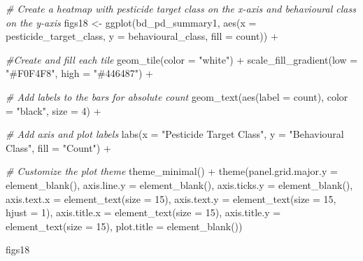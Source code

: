 \documentclass[
]{article}
\newenvironment{Shaded}{\begin{snugshade}}{\end{snugshade}}
\newcommand{\AttributeTok}[1]{\textcolor[rgb]{0.77,0.63,0.00}{#1}}
\newcommand{\CommentTok}[1]{\textcolor[rgb]{0.56,0.35,0.01}{\textit{#1}}}
\newcommand{\DecValTok}[1]{\textcolor[rgb]{0.00,0.00,0.81}{#1}}
\newcommand{\FunctionTok}[1]{\textcolor[rgb]{0.00,0.00,0.00}{#1}}
\newcommand{\NormalTok}[1]{#1}
\newcommand{\OtherTok}[1]{\textcolor[rgb]{0.56,0.35,0.01}{#1}}
\newcommand{\SpecialCharTok}[1]{\textcolor[rgb]{0.00,0.00,0.00}{#1}}
\newcommand{\StringTok}[1]{\textcolor[rgb]{0.31,0.60,0.02}{#1}}
\begin{document}
\begin{Shaded}
\begin{Highlighting}[]
\CommentTok{\# Create a heatmap with pesticide target class on the x{-}axis and behavioural class on the y{-}axis}
\NormalTok{figs18 }\OtherTok{\textless{}{-}} \FunctionTok{ggplot}\NormalTok{(bd\_pd\_summary1, }\FunctionTok{aes}\NormalTok{(}\AttributeTok{x =}\NormalTok{ pesticide\_target\_class, }\AttributeTok{y =}\NormalTok{ behavioural\_class, }\AttributeTok{fill =}\NormalTok{ count)) }\SpecialCharTok{+}
  
  \CommentTok{\#Create and fill each tile }
  \FunctionTok{geom\_tile}\NormalTok{(}\AttributeTok{color =} \StringTok{"white"}\NormalTok{) }\SpecialCharTok{+}
  \FunctionTok{scale\_fill\_gradient}\NormalTok{(}\AttributeTok{low =} \StringTok{"\#F0F4F8"}\NormalTok{, }\AttributeTok{high =} \StringTok{"\#446487"}\NormalTok{) }\SpecialCharTok{+}
  
  \CommentTok{\# Add labels to the bars for absolute count  }
  \FunctionTok{geom\_text}\NormalTok{(}\FunctionTok{aes}\NormalTok{(}\AttributeTok{label =}\NormalTok{ count), }\AttributeTok{color =} \StringTok{"black"}\NormalTok{, }\AttributeTok{size =} \DecValTok{4}\NormalTok{) }\SpecialCharTok{+} 
  
  \CommentTok{\# Add axis and plot labels}
  \FunctionTok{labs}\NormalTok{(}\AttributeTok{x =} \StringTok{"Pesticide Target Class"}\NormalTok{, }\AttributeTok{y =} \StringTok{"Behavioural Class"}\NormalTok{, }\AttributeTok{fill =} \StringTok{"Count"}\NormalTok{) }\SpecialCharTok{+}
  
  \CommentTok{\# Customize the plot theme}
  \FunctionTok{theme\_minimal}\NormalTok{() }\SpecialCharTok{+}
  \FunctionTok{theme}\NormalTok{(}\AttributeTok{panel.grid.major.y =} \FunctionTok{element\_blank}\NormalTok{(),}
        \AttributeTok{axis.line.y =} \FunctionTok{element\_blank}\NormalTok{(),}
        \AttributeTok{axis.ticks.y =} \FunctionTok{element\_blank}\NormalTok{(),}
        \AttributeTok{axis.text.x =} \FunctionTok{element\_text}\NormalTok{(}\AttributeTok{size =} \DecValTok{15}\NormalTok{),}
        \AttributeTok{axis.text.y =} \FunctionTok{element\_text}\NormalTok{(}\AttributeTok{size =} \DecValTok{15}\NormalTok{, }\AttributeTok{hjust =} \DecValTok{1}\NormalTok{),}
        \AttributeTok{axis.title.x =} \FunctionTok{element\_text}\NormalTok{(}\AttributeTok{size =} \DecValTok{15}\NormalTok{),}
        \AttributeTok{axis.title.y =} \FunctionTok{element\_text}\NormalTok{(}\AttributeTok{size =} \DecValTok{15}\NormalTok{),}
        \AttributeTok{plot.title =} \FunctionTok{element\_blank}\NormalTok{())}


\NormalTok{figs18}
\end{Highlighting}
\end{Shaded}
\end{document}
